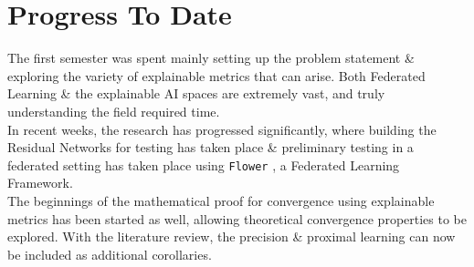 \chapter{Progress  To Date}
The first semester was spent mainly setting up the problem statement \& exploring the variety of explainable metrics that can arise. Both Federated Learning \& the explainable AI spaces are extremely vast, and truly understanding the field required time. \\

In recent weeks, the research has progressed significantly, where building the Residual Networks for testing has taken place \& preliminary testing in a federated setting has taken place using \texttt{Flower} \cite{beutel2020flower}, a Federated Learning Framework. \\

The beginnings of the mathematical proof for convergence using explainable metrics has been started as well, allowing theoretical convergence properties to be explored. With the literature review, the precision \& proximal learning can now be included as additional corollaries.

